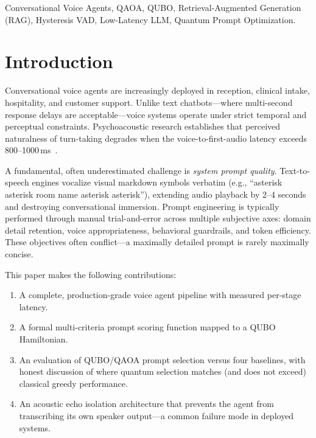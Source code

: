 \documentclass[conference]{IEEEtran}
\begin{document}
\begin{IEEEkeywords}
Conversational Voice Agents, QAOA, QUBO, Retrieval-Augmented Generation (RAG), Hysteresis VAD, Low-Latency LLM, Quantum Prompt Optimization.
\end{IEEEkeywords}

\section{Introduction}

Conversational voice agents are increasingly deployed in reception, clinical intake, hospitality, and customer support. Unlike text chatbots---where multi-second response delays are acceptable---voice systems operate under strict temporal and perceptual constraints. Psychoacoustic research establishes that perceived naturalness of turn-taking degrades when the voice-to-first-audio latency exceeds 800--1000\,ms~\cite{larson2020}.

A fundamental, often underestimated challenge is \textit{system prompt quality}. Text-to-speech engines vocalize visual markdown symbols verbatim (e.g., ``asterisk asterisk room name asterisk asterisk''), extending audio playback by 2--4 seconds and destroying conversational immersion. Prompt engineering is typically performed through manual trial-and-error across multiple subjective axes: domain detail retention, voice appropriateness, behavioral guardrails, and token efficiency. These objectives often conflict---a maximally detailed prompt is rarely maximally concise.

This paper makes the following contributions:
\begin{enumerate}
    \item A complete, production-grade voice agent pipeline with measured per-stage latency.
    \item A formal multi-criteria prompt scoring function mapped to a QUBO Hamiltonian.
    \item An evaluation of QUBO/QAOA prompt selection versus four baselines, with honest discussion of where quantum selection matches (and does not exceed) classical greedy performance.
    \item An acoustic echo isolation architecture that prevents the agent from transcribing its own speaker output---a common failure mode in deployed systems.
\end{enumerate}
\end{document}
